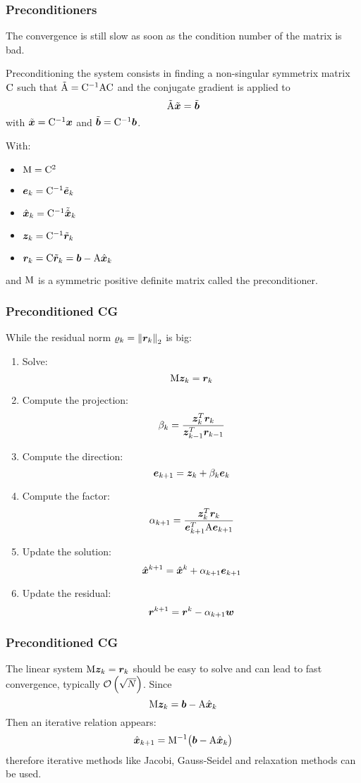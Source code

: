 \begin{frame}
  \frametitle{Preconditioners}

The convergence is still slow as soon as the condition number of the matrix is bad.

\medskip
Preconditioning the system consists in finding a non-singular symmetrix matrix ${\mathrm C}$ such that $\tilde {{\mathrm A}} = {\mathrm C}^{-1}{\mathrm A}{\mathrm C}$ and the conjugate gradient is applied to
\[
\tilde{{\mathrm A}} \tilde{{\boldsymbol x}} = \tilde{{\boldsymbol b}}
\]
with $\tilde{{\boldsymbol x}} = {\mathrm C}^{-1}{\boldsymbol x}$ and $\tilde{{\boldsymbol b}} = {\mathrm C}^{-1}{\boldsymbol b}$.

\medskip
With:
\begin{itemize}
\item ${\mathrm M} = {\mathrm C}^2$
\item ${\boldsymbol e}_k = {\mathrm C}^{-1}\tilde{{\boldsymbol e}}_k$
\item $\hat{\boldsymbol x}_k = {\mathrm C}^{-1}\tilde{\hat{\boldsymbol x}}_k$
\item ${\boldsymbol z}_k = {\mathrm C}^{-1}\tilde{{\boldsymbol r}}_k$
\item ${\boldsymbol r}_k = {\mathrm C}\tilde{{\boldsymbol r}}_k = {\boldsymbol b} - {\mathrm A}\hat{\boldsymbol x}_k$
\end{itemize}
and ${\mathrm M}$ is a symmetric positive definite matrix called the preconditioner.

\end{frame}

\begin{frame}
  \frametitle{Preconditioned CG}

While the residual norm $\varrho_k = {\lVert {\boldsymbol r}_k \rVert}_2$ is big:
\begin{enumerate}

\item Solve:
\[
{\mathrm M}{\boldsymbol z}_{k} = {\boldsymbol r}_k
\]
\item Compute the projection:
\[
\beta_k = \frac{{\boldsymbol z}_{k}^T{\boldsymbol r}_k}{{\boldsymbol z}_{k-1}^T{\boldsymbol r}_{k-1}}
\]
\item Compute the direction:
\[
{\boldsymbol e}_{k+1} = {\boldsymbol z}_k + \beta_k{\boldsymbol e}_k
\]
\item Compute the factor:
\[
\alpha_{k+1} = \frac{{\boldsymbol z}_{k}^T{\boldsymbol r}_k}{{\boldsymbol e}^T_{k+1}{\mathrm A}{\boldsymbol e}_{k+1}}
\]
\item Update the solution:
\[
\hat{\boldsymbol x}^{k+1} = \hat{\boldsymbol x}^k + \alpha_{k+1} {\boldsymbol e}_{k+1}
\]
\item Update the residual:
\[
{\boldsymbol r}^{k+1} = {\boldsymbol r}^k - \alpha_{k+1} {\boldsymbol w}
\]
\end{enumerate}

\end{frame}

\begin{frame}
  \frametitle{Preconditioned CG}

\medskip
The linear system ${\mathrm M}{\boldsymbol z}_{k} = {\boldsymbol r}_k$ should be easy to solve and can lead to fast convergence, typically $\mathcal{O}\left(\sqrt{N}\right)$.
Since
\[
{\mathrm M}{\boldsymbol z}_{k} = {\boldsymbol b} - {\mathrm A}\hat{\boldsymbol x}_k
\]
Then an iterative relation appears:
\[
\hat{\boldsymbol x}_{k+1} = {\mathrm M}^{-1}\bigl({\boldsymbol b} - {\mathrm A}\hat{\boldsymbol x}_k\bigr)
\]
therefore iterative methods like Jacobi, Gauss-Seidel and relaxation methods can be used.

\end{frame}


